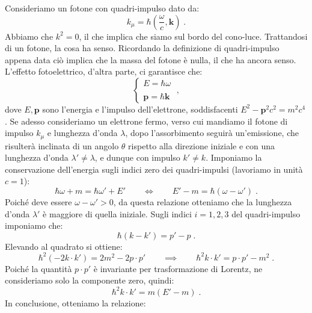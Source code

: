 \begin{exm} 
Consideriamo un fotone con quadri-impulso dato da:
\begin{equation}
 k_{\mu}=\hbar\left(\frac{\omega}{c},\mathbf{k}\right)\;.
\end{equation}
Abbiamo che $k^2=0$, il che implica che siamo sul bordo del cono-luce. Trattandosi di un fotone, la cosa ha senso. Ricordando la 
definizione di quadri-impulso appena data ciò implica che la massa del fotone è nulla, il che ha ancora senso. L'effetto fotoelettrico, d'altra parte, ci garantisce che:
\begin{equation}
 \begin{cases}
  E=\hbar\omega \\
\\
\mathbf{p}=\hbar\mathbf{k}
 \end{cases}\;,
\end{equation}
dove $E,\mathbf{p}$ sono l'energia e l'impulso dell'elettrone, soddisfacenti $E^2-\mathbf{p}^2c^2=m^2c^4$. Se adesso consideriamo un elettrone fermo, verso cui mandiamo il fotone di impulso $k_{\mu}$ e lunghezza d'onda $\lambda$, dopo 
l'assorbimento seguirà un'emissione, che risulterà inclinata di un angolo $\theta$ rispetto alla direzione iniziale e con una lunghezza 
d'onda $\lambda'\ne\lambda$, e dunque con impulso $k'\ne k$. Imponiamo la conservazione dell'energia sugli indici zero dei quadri-impulsi (lavoriamo in unità $c=1$):
\begin{equation}
 \hbar\omega+m=\hbar\omega'+E'\qquad  \Longleftrightarrow\qquad  E'-m=\hbar(\omega-\omega')\;. \label{ch4_sistema1}
\end{equation}
Poiché deve essere $\omega-\omega'>0$, da questa relazione otteniamo che la lunghezza d'onda $\lambda'$ è maggiore di quella iniziale. 
Sugli indici $i=1,2,3$ del quadri-impulso imponiamo che:
\begin{equation}
\hbar (k-k')=p'-p\;.
\end{equation}
Elevando al quadrato si ottiene:
\begin{equation}
\hbar^2(-2k\cdot k')=2m^2-2p\cdot p'\qquad \implies\qquad \hbar^2k\cdot k'=p\cdot p'-m^2\;.
\end{equation}
Poiché la quantità $p\cdot p'$ è invariante per trasformazione di Lorentz, ne consideriamo solo la componente zero, quindi:
\begin{equation}
\hbar^2k\cdot k'=m(E'-m)\;.
\end{equation}
In conclusione, otteniamo la relazione:
\begin{equation}

\end{equation}
\end{exm}
